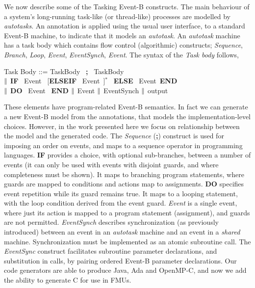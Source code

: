 \documentclass{llncs}%
\begin{document}
We now describe some of the Tasking Event-B constructs. The main behaviour of a system's  long-running task-like (or thread-like) processes are modelled by \emph{autotasks}. An annotation is applied using the usual user interface, to a standard Event-B machine, to indicate that it models an \emph{autotask}. An \emph{autotask} machine has a task body which contains flow control (algorithmic) constructs; \emph{Sequence}, \emph{Branch}, \emph{Loop}, \emph{Event}, \emph{EventSynch}, \emph{Event}. The syntax of the \emph{Task body} follows,
%
%
\begin{center}
\begin{minipage}{0.7\textwidth}
Task Body ::= TaskBody~ \textbf{;}~ TaskBody\\
\hspace*{1cm}$\mathbin\|$ \textbf{IF}~ Event~ [\textbf{ELSEIF}~ Event~]$^*$~ \textbf{ELSE}~ Event~\textbf{END} \\
\hspace*{1cm}$\mathbin\|$ \textbf{DO}~ Event~ \textbf{END} $\mathbin\|$ Event $\mathbin\|$ EventSynch $\mathbin\|$ output 
\end{minipage}
\end{center}
%
%
\noindent These elements have program-related Event-B semantics. In fact we can generate a new Event-B model from the annotations, that models the implementation-level choices. However, in the work presented here we focus on relationship between the model and the generated code. The \emph{Sequence} (\textbf{;}) construct is used for imposing an order on events, and maps to a sequence operator in programming languages. \textbf{IF} provides a choice, with optional sub-branches, between a number of events (it can only be used with events with disjoint guards, and where completeness must be shown). It maps to branching program statements, where guards are mapped to conditions and actions map to assignments. \textbf{DO} specifies event repetition while its guard remains true. It maps to a looping statement, with the loop condition derived from the event guard. \emph{Event} is a single event, where just its action is mapped to a program statement (assignment), and guards are not permitted. \emph{EventSynch} describes synchronization (as previously introduced) between an event in an \emph{autotask} machine and an event in a \emph{shared} machine. Synchronization must be implemented as an atomic subroutine call. The \emph{EventSync} construct facilitates subroutine parameter declarations, and substitution in calls, by pairing ordered Event-B parameter declarations. Our code generators are able to produce Java, Ada and OpenMP-C, and now we add the ability to generate C for use in FMUs.
\end{document}
